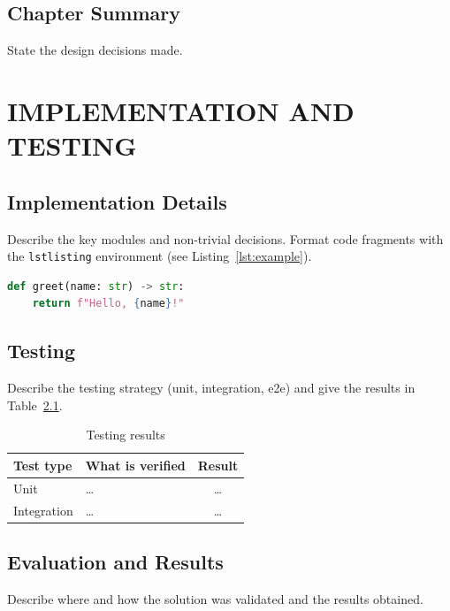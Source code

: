 \documentclass[12pt,a4paper]{extreport}
\begin{document}
\section{Chapter Summary}
State the design decisions made.

\clearpage

\chapter{IMPLEMENTATION AND TESTING}
\section{Implementation Details}
Describe the key modules and non-trivial decisions. Format code fragments with
the \texttt{lstlisting} environment (see Listing~\ref{lst:example}).

\begin{lstlisting}[language=Python, caption={Example function}, label={lst:example}]
def greet(name: str) -> str:
    return f"Hello, {name}!"
\end{lstlisting}

\section{Testing}
Describe the testing strategy (unit, integration, e2e) and give the results in
Table~\ref{tab:test-results}.

\begin{table}[H]
\caption{Testing results}
\label{tab:test-results}
\centering
\begin{tabular}{|>{\raggedright\arraybackslash}p{4cm}|>{\raggedright\arraybackslash}p{8cm}|c|}
\hline
\textbf{Test type} & \textbf{What is verified} & \textbf{Result} \\
\hline
Unit & \ldots & \ldots \\
\hline
Integration & \ldots & \ldots \\
\hline
\end{tabular}
\end{table}

\section{Evaluation and Results}
Describe where and how the solution was validated and the results obtained.
\end{document}
